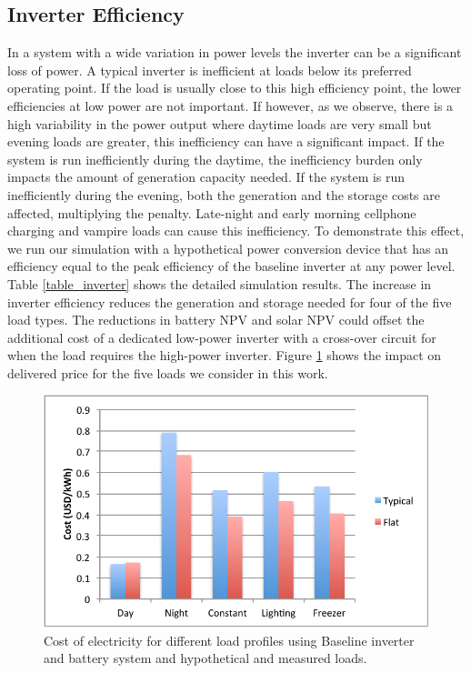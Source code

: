 \documentclass[conference]{IEEEtran}
\begin{document}
\subsection{Inverter Efficiency}

In a system with a wide variation in power levels the inverter can
be a significant loss of power.
A typical inverter is inefficient at loads below its
preferred operating point.
If the load is usually close to this high efficiency
point, the lower efficiencies at low power are not important.
If however, as we observe, there is a high variability
in the power output where daytime loads are very small
but evening loads are greater, this inefficiency can have
a significant impact.
If the system is run inefficiently during the daytime, the inefficiency
burden only impacts the amount of generation capacity needed.
If the system is run inefficiently during the evening, both the
generation and the storage costs are affected, multiplying the
penalty.
Late-night and early morning cellphone charging and vampire
loads can cause this inefficiency.
To demonstrate this effect, we run our simulation with
a hypothetical power conversion device that has an
efficiency equal to the peak efficiency of the baseline
inverter at any power level.
Table \ref{table_inverter} shows the detailed simulation
results.
The increase in inverter efficiency reduces the generation
and storage needed for four of the five load types.
The reductions in battery NPV and solar NPV could offset the
additional cost of a dedicated low-power inverter with a
cross-over circuit for when the load requires the high-power inverter.
Figure \ref{fig_inverter}
shows the impact on delivered price for the five loads we
consider in this work.

\begin{figure}[]
\begin{center}
\includegraphics[width=\columnwidth]{figures/inverter.pdf}
\end{center}
\caption{Cost of electricity for different load profiles using Baseline
inverter and battery system and hypothetical and measured loads.}
\label{fig_inverter}
\end{figure}
\end{document}
